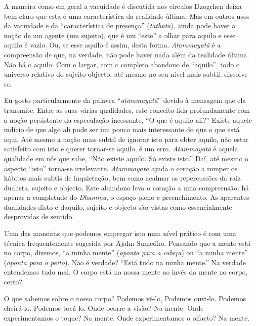 A maneira como em geral a vacuidade é discutida nos círculos
Dzogchen deixa bem claro que esta é uma característica da realidade
última. Mas em outros usos da vacuidade e da ``característica de
presença'' (\emph{tathatā}), ainda pode haver a noção de um agente (um
sujeito), que é um ``este'' a olhar para aquilo e esse aquilo é vazio.
Ou, se esse aquilo é assim, desta forma.  \emph{Atammayatā} é a
compreensão de que, na verdade, não pode haver nada além da realidade
última. Não há o aquilo. Com o largar, com o completo abandono de
``aquilo'', todo o universo relativo do sujeito-objecto, até mesmo no
seu nível mais subtil, dissolve-se.

Eu gosto particularmente da palavra ``\emph{atammayatā}'' devido à
mensagem que ela transmite. Entre as suas várias qualidades, este
conceito lida profundamente com a noção persistente da especulação
incessante, ``O que é aquilo ali?'' Existe aquele indício de que algo
ali pode ser um pouco mais interessante do que o que está aqui. Até
mesmo a noção mais subtil de ignorar isto para obter aquilo, não estar
satisfeito com isto e querer tornar-se aquilo, é um erro.
\emph{Atammayatā} é aquela qualidade em nós que sabe, ``Não existe
aquilo. Só existe isto.'' Daí, até mesmo o aspecto ``isto'' torna-se
irrelevante.  \emph{Atammayatā} ajuda o coração a romper os hábitos mais
subtis de inquietação, bem como acalmar as repercussões da raiz
dualista, sujeito e objecto. Este abandono leva o coração a uma
compreensão: há apenas a completude do \emph{Dhamma}, o espaço pleno e
preenchimento. As aparentes dualidades disto e daquilo, sujeito e
objecto são vistas como essencialmente desprovidas de sentido.

Uma das maneiras que podemos empregar isto num nível prático é com uma
técnica frequentemente sugerida por Ajahn Sumedho. Pensando que a mente
está no corpo, dizemos, ``a minha mente'' (\emph{aponta para a cabeça})
ou ``a minha mente'' (\emph{aponta para o peito}). Não é verdade? ``Está
tudo na minha mente.'' Na verdade entendemos tudo mal. O corpo está na
nossa mente ao invés da mente no corpo, certo?

O que sabemos sobre o nosso corpo? Podemos vê-lo, Podemos ouvi-lo.
Podemos cheirá-lo. Podemos tocá-lo. Onde ocorre a visão? Na mente. Onde
experimentamos o toque? Na mente. Onde experimentamos o olfacto? Na
mente.

